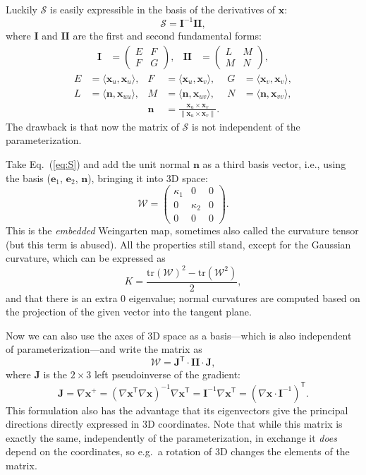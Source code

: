 \documentclass[a4paper]{article}
\begin{document}
Luckily $\mathcal{S}$ is easily expressible in the basis of the derivatives of
$\mathbf{x}$:
\[\mathcal{S}=\mathbf{I}^{-1}\mathbf{I\!I},\]
where $\mathbf{I}$ and $\mathbf{I\!I}$ are the first and second fundamental forms:
\begin{align*}
  \mathbf{I} &= \begin{pmatrix}E&F\\F&G\end{pmatrix}, &
  \mathbf{I\!I} &= \begin{pmatrix}L&M\\M&N\end{pmatrix},
\end{align*}
\begin{align*}
  E &= \langle\mathbf{x}_u,\mathbf{x}_u\rangle, &
  F &= \langle\mathbf{x}_u,\mathbf{x}_v\rangle, &
  G &= \langle\mathbf{x}_v,\mathbf{x}_v\rangle,\\
  L &= \langle\mathbf{n},\mathbf{x}_{uu}\rangle, &
  M &= \langle\mathbf{n},\mathbf{x}_{uv}\rangle, &
  N &= \langle\mathbf{n},\mathbf{x}_{vv}\rangle,\\
  && \mathbf{n} &= \frac{\mathbf{x}_u\times\mathbf{x}_v}{\|{\mathbf{x}_u\times\mathbf{x}_v}\|}. &&
\end{align*}
The drawback is that now the matrix of $\mathcal{S}$ is not independent of the parameterization.

Take Eq.~(\ref{eq:S}) and add the unit normal $\mathbf{n}$ as a
third basis vector, i.e., using the basis ($\mathbf{e}_1$,
$\mathbf{e}_2$, $\mathbf{n}$), bringing it into 3D space:
\[
  \mathcal{W}=
  \begin{pmatrix}
    \kappa_1 & 0 & 0\\
    0 & \kappa_2 & 0\\
    0 & 0 & 0
  \end{pmatrix}.
\]
This is the \emph{embedded} Weingarten map, sometimes also called the
curvature tensor (but this term is abused). All the properties still
stand, except for the Gaussian curvature, which can be expressed as
\[K = \frac{\mathrm{tr}(\mathcal{W})^2-\mathrm{tr}(\mathcal{W}^2)}{2},\]
and that there is an extra $0$ eigenvalue; normal curvatures are
computed based on the projection of the given vector into the tangent plane.

Now we can also use the axes of 3D space as a basis---which is also
independent of parameterization---and write the matrix as
\[\mathcal{W}=\mathbf{J}^\textsf{T}\cdot\mathbf{I\!I}\cdot\mathbf{J},\]
where $\mathbf{J}$ is the $2\times3$ left pseudoinverse of the gradient:
\[\mathbf{J}=
\nabla\mathbf{x}^+=
(\nabla\mathbf{x}^\textsf{T}\nabla\mathbf{x})^{-1}\nabla\mathbf{x}^\textsf{T}=
\mathbf{I}^{-1}\nabla\mathbf{x}^\textsf{T}=
(\nabla\mathbf{x}\cdot\mathbf{I}^{-1})^\textsf{T}.\]
This formulation also has the advantage that its eigenvectors give the
principal directions directly expressed in 3D coordinates. Note that
while this matrix is exactly the same, independently of the
parameterization, in exchange it \emph{does} depend on the
coordinates, so e.g.~a rotation of 3D changes the elements of the
matrix.
\end{document}
